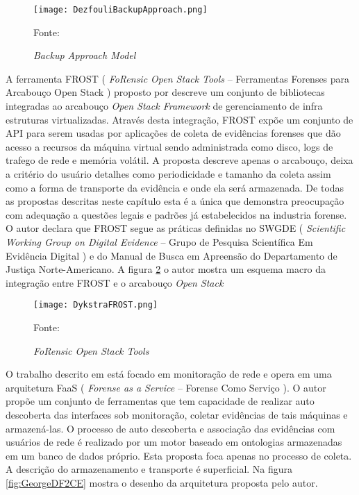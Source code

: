\begin{figure}[htb!]
\footnotesize
\caption{\textit{Backup Approach Model}}
\texttt{[image: DezfouliBackupApproach.png]}
\centering
\label{fig:DezfouliBackupApproach}
\begin{center}
Fonte: \cite{DezfouliBackupApproach:2012} 
\end{center}
\end{figure}

A ferramenta FROST ( \textit{FoRensic Open Stack Tools} -- Ferramentas Forenses para Arcabouço Open Stack ) proposto por \cite{DykstraFROST:2013} descreve um conjunto de bibliotecas integradas ao arcabouço \textit{Open Stack Framework} de gerenciamento de infra estruturas virtualizadas.
%
Através desta integração, FROST expõe um conjunto de API para serem usadas por aplicações de coleta de evidências forenses que dão acesso a recursos da máquina virtual sendo administrada como disco, logs de trafego de rede e memória volátil.
%
A proposta descreve apenas o arcabouço, deixa a critério do usuário detalhes como periodicidade e tamanho da coleta assim como a forma de transporte da evidência e onde ela será armazenada.
%
De todas as propostas descritas neste capítulo esta é a única que demonstra preocupação com adequação a questões legais e padrões já estabelecidos na industria forense.
%
O autor declara que FROST segue as práticas definidas no SWGDE ( \textit{Scientific Working Group on Digital Evidence} -- Grupo de Pesquisa Scientífica Em Evidência Digital ) e do Manual de Busca em Apreensão do Departamento de Justiça Norte-Americano.
%
A figura \ref{fig:DykstraFROST} o autor mostra um esquema macro da integração entre FROST e o arcabouço \textit{Open Stack}

\begin{figure}[htb!]
\footnotesize
\caption{\textit{FoRensic Open Stack Tools}}
\texttt{[image: DykstraFROST.png]}
\centering
\label{fig:DykstraFROST}
\begin{center}
Fonte: \cite{DykstraFROST:2013} 
\end{center}
\end{figure}
%

O trabalho descrito em \cite{GeorgeDF2CE:2012} está focado em monitoração de rede e opera em uma arquitetura FaaS ( \textit{Forense as a Service} -- Forense Como Serviço ). 
%
O autor propõe um conjunto de ferramentas que tem capacidade de realizar auto descoberta das interfaces sob monitoração, coletar evidências de tais máquinas e armazená-las.
%
O processo de auto descoberta e associação das evidências com usuários de rede é realizado por um motor baseado em ontologias armazenadas em um banco de dados próprio.
%
Esta proposta foca apenas no processo de coleta. A descrição do armazenamento e transporte é superficial.
%
Na figura \ref{fig:GeorgeDF2CE} mostra o desenho da arquitetura proposta pelo autor.

